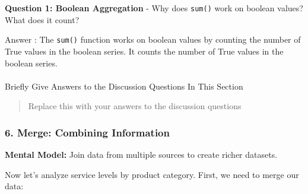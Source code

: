 \documentclass[
  letterpaper,
  DIV=11,
  numbers=noendperiod]{scrartcl}
\makeatletter
\let\oldparagraph\paragraph
\renewcommand{\paragraph}{
    \@ifstar
      \xxxParagraphStar
      \xxxParagraphNoStar
  }
\newcommand{\xxxParagraphStar}[1]{\oldparagraph*{#1}\mbox{}}
\newcommand{\xxxParagraphNoStar}[1]{\oldparagraph{#1}\mbox{}}
\makeatother
\begin{document}
\begin{tcolorbox}[enhanced jigsaw, colframe=quarto-callout-important-color-frame, title=\textcolor{quarto-callout-important-color}{\faExclamation}\hspace{0.5em}{🤔 Discussion Questions: Aggregate Mental Model}, breakable, opacityback=0, arc=.35mm, leftrule=.75mm, titlerule=0mm, left=2mm, toptitle=1mm, rightrule=.15mm, bottomtitle=1mm, bottomrule=.15mm, opacitybacktitle=0.6, toprule=.15mm, colback=white, coltitle=black, colbacktitle=quarto-callout-important-color!10!white]

\textbf{Question 1: Boolean Aggregation} - Why does \texttt{sum()} work
on boolean values? What does it count?

Answer : The \texttt{sum()} function works on boolean values by counting
the number of True values in the boolean series. It counts the number of
True values in the boolean series.

\end{tcolorbox}

\paragraph{Briefly Give Answers to the Discussion Questions In This
Section}\label{briefly-give-answers-to-the-discussion-questions-in-this-section-4}

\begin{quote}
Replace this with your answers to the discussion questions
\end{quote}

\subsubsection{6. Merge: Combining
Information}\label{merge-combining-information}

\textbf{Mental Model:} Join data from multiple sources to create richer
datasets.

Now let's analyze service levels by product category. First, we need to
merge our data:
\end{document}
